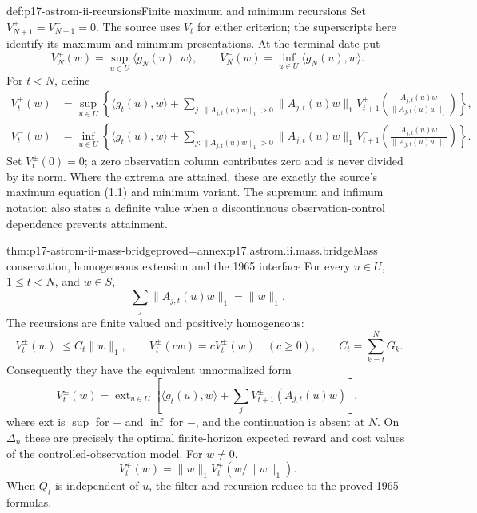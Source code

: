 \begin{hbdefinition}{def:p17-astrom-ii-recursions}{Finite maximum and minimum recursions}
Set \(V_{N+1}^+=V_{N+1}^-=0\).
The source uses \(V_t\) for either criterion; the superscripts
here identify its maximum and minimum presentations.
At the terminal date put
\[
              V_N^+(w)=\sup_{u\in U}\langle g_N(u),w\rangle,
 \qquad
              V_N^-(w)=\inf_{u\in U}\langle g_N(u),w\rangle.
\]
For \(t<N\), define
\[
 \begin{split}
 V_t^+(w)&=\sup_{u\in U}
       \left\{\langle g_t(u),w\rangle+
       \sum_{j:\|A_{j,t}(u)w\|_1>0}
       \|A_{j,t}(u)w\|_1
       V_{t+1}^+\!\left(\frac{A_{j,t}(u)w}{\|A_{j,t}(u)w\|_1}\right)
       \right\},\\
 V_t^-(w)&=\inf_{u\in U}
       \left\{\langle g_t(u),w\rangle+
       \sum_{j:\|A_{j,t}(u)w\|_1>0}
       \|A_{j,t}(u)w\|_1
       V_{t+1}^-\!\left(\frac{A_{j,t}(u)w}{\|A_{j,t}(u)w\|_1}\right)
       \right\}.
 \end{split}
\]
Set \(V_t^\pm(0)=0\); a zero observation column contributes
zero and is never divided by its norm.
Where the extrema are attained, these are exactly the
source's maximum equation (1.1) and minimum variant.
The supremum and infimum notation also states a definite
value when a discontinuous observation-control dependence
prevents attainment.
\end{hbdefinition}

\begin{hbtheorem}{thm:p17-astrom-ii-mass-bridge}{proved=annex:p17.astrom.ii.mass.bridge}{Mass conservation, homogeneous extension and the 1965 interface}
For every \(u\in U\), \(1\leq t<N\), and \(w\in S\),
\[
           \sum_j\|A_{j,t}(u)w\|_1=\|w\|_1.
\]
The recursions are finite valued and positively homogeneous:
\[
 |V_t^\pm(w)|\leq C_t\|w\|_1,\qquad
 V_t^\pm(cw)=cV_t^\pm(w)\quad(c\geq0),\qquad
 C_t=\sum_{k=t}^N G_k.
\]
Consequently they have the equivalent unnormalized form
\[
 V_t^\pm(w)=\mathop{\mathrm{ext}}_{u\in U}
           \left[\langle g_t(u),w\rangle+
                         \sum_jV_{t+1}^\pm(A_{j,t}(u)w)\right],
\]
where \(\mathrm{ext}\) is \(\sup\) for \(+\) and \(\inf\)
for \(-\), and the continuation is absent at \(N\).
On \(\Delta_n\) these are precisely the optimal finite-horizon
expected reward and cost values of the controlled-observation
model. For \(w\ne0\),
\[
              V_t^\pm(w)=\|w\|_1
                       V_t^\pm(w/\|w\|_1).
\]
When \(Q_t\) is independent of \(u\), the filter and recursion
reduce to the proved 1965 formulas.
\end{hbtheorem}

